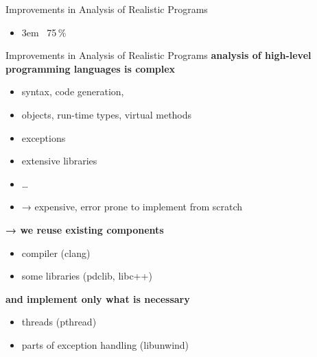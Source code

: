 \documentclass[aspectratio=169, fi]{paradise-slide}
\newcommand{\fcite}[1]{\emergencystretch 3em{\protect\NoHyper\cite{#1}}~\fullcite{#1}}
\newenvironment{prespart}[1]{%
  \begin{frame}{}%
    \centering
      {\Large #1} \par\bigskip\bigskip%
}{%
  \end{frame}%
}
\begin{document}
\begin{prespart}{Improvements in Analysis of Realistic Programs}
  \begin{itemize}
    \item \fcite{SRB2017} \hfill 75\,\%
  \end{itemize}
\end{prespart}

\begin{frame}{Improvements in Analysis of Realistic Programs}
  \textbf{analysis of high-level programming languages is complex} \pause
  \begin{itemize}
    \item syntax, code generation,
    \item objects, run-time types, virtual methods
    \item exceptions
    \item extensive libraries
    \item …
    \item → expensive, error prone to implement from scratch
  \end{itemize}

  \pause\bigskip
  \textbf{→ we reuse existing components}
  \begin{itemize}
    \item compiler (clang)
    \item some libraries (pdclib, libc++)
  \end{itemize}

  \bigskip
  \textbf{and implement only what is necessary}
  \begin{itemize}
    \item threads (pthread)
    \item parts of exception handling (libunwind)
  \end{itemize}
\end{frame}
\end{document}
